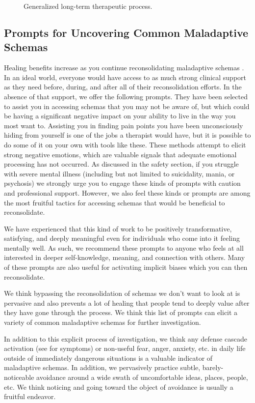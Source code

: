 \documentclass[12pt,letterpaper]{article}
\begin{document}
\begin{figure}[h!]
\begin{framed}
\begin{tikzpicture}[on grid, node distance=1.5cm]
\end{tikzpicture}
\end{framed}
\caption{Generalized long-term therapeutic process.}
\label{fig:process}
\end{figure}
\FloatBarrier
\subsection{Prompts for Uncovering Common Maladaptive Schemas}
\label{uncovering}
Healing benefits increase as you continue reconsolidating maladaptive schemas \cite{rachmanProcessing}. In an ideal world, everyone would have access to as much strong clinical support as they need before, during, and after all of their reconsolidation efforts. In the absence of that support, we offer the following prompts. They have been selected to assist you in accessing schemas that you may not be aware of, but which could be having a significant negative impact on your ability to live in the way you most want to. Assisting you in finding pain points you have been unconsciously hiding from yourself is one of the jobs a therapist would have, but it is possible to do some of it on your own with tools like these. These methods attempt to elicit strong negative emotions, which are valuable signals that adequate emotional processing has not occurred. As discussed in the safety section, if you struggle with severe mental illness (including but not limited to suicidality, mania, or psychosis) we strongly urge you to engage these kinds of prompts with caution and professional support. However, we also feel these kinds or prompts are among the most fruitful tactics for accessing schemas that would be beneficial to reconsolidate.

We have experienced that this kind of work to be positively transformative, satisfying, and deeply meaningful even for individuals who come into it feeling mentally well. As such, we recommend these prompts to anyone who feels at all interested in deeper self-knowledge, meaning, and connection with others. Many of these prompts are also useful for activating implicit biases which you can then reconsolidate.

We think bypassing the reconsolidation of schemas we don't want to look at is pervasive and also prevents a lot of healing that people tend to deeply value after they have gone through the process. We think this list of prompts can elicit a variety of common maladaptive schemas for further investigation.

In addition to this explicit process of investigation, we think any defense cascade activation (see \textcite{cheetahSigns} for symptoms) or non-useful fear, anger, anxiety, etc. in daily life outside of immediately dangerous situations is a valuable indicator of maladaptive schemas. In addition, we pervasively practice subtle, barely-noticeable avoidance around a wide swath of uncomfortable ideas, places, people, etc. We think noticing and going toward the object of avoidance is usually a fruitful endeavor.
\end{document}
